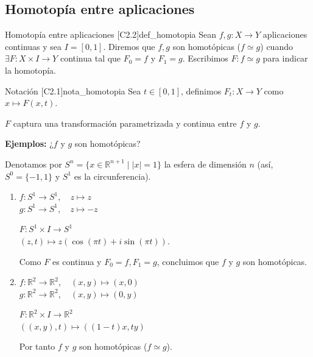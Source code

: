 \subsection{Homotopía entre aplicaciones}

\begin{definicion}{Homotopía entre aplicaciones [C2.2]}{def_homotopia}
Sean $f, g \colon X \to Y$ aplicaciones continuas y sea $I = [0,1]$. Diremos que $f, g$ son homotópicas ($f \simeq g$) cuando $\exists F \colon X \times I \to Y$ continua tal que $F_0 = f$ y $F_1 = g$. Escribimos $F \colon f \simeq g$ para indicar la homotopía.
\end{definicion}

\begin{nota}{Notación [C2.1]}{nota_homotopia}
Sea $t \in [0,1]$, definimos $F_t \colon X \to Y$ como $x \mapsto F(x,t)$.
\end{nota}

\begin{center}
\end{center}

$F$ captura una transformación parametrizada y continua entre $f$ y $g$.

\vspace{0.5cm}
\textbf{Ejemplos:} ¿$f$ y $g$ son homotópicas?

Denotamos por $S^n = \{x \in \mathbb{R}^{n+1} \mid |x| = 1\}$ la esfera de dimensión $n$ (así, $S^0 = \{-1,1\}$ y $S^1$ es la circunferencia).

\begin{enumerate}
    \item $f \colon S^1 \to S^1, \quad z \mapsto z$ \\
    $g \colon S^1 \to S^1, \quad z \mapsto -z$
    
    $F \colon S^1 \times I \to S^1$ \\
    $(z, t) \mapsto z(\cos(\pi t) + i \sin(\pi t))$. 
    
    Como $F$ es continua y $F_0 = f, F_1 = g$, concluimos que $f$ y $g$ son homotópicas.
    
    \item $f \colon \mathbb{R}^2 \to \mathbb{R}^2, \quad (x,y) \mapsto (x,0)$ \\
    $g \colon \mathbb{R}^2 \to \mathbb{R}^2, \quad (x,y) \mapsto (0,y)$
    
    $F \colon \mathbb{R}^2 \times I \to \mathbb{R}^2$ \\
    $((x,y), t) \mapsto ((1-t)x, ty)$
    
    Por tanto $f$ y $g$ son homotópicas ($f \simeq g$).
\end{enumerate}

